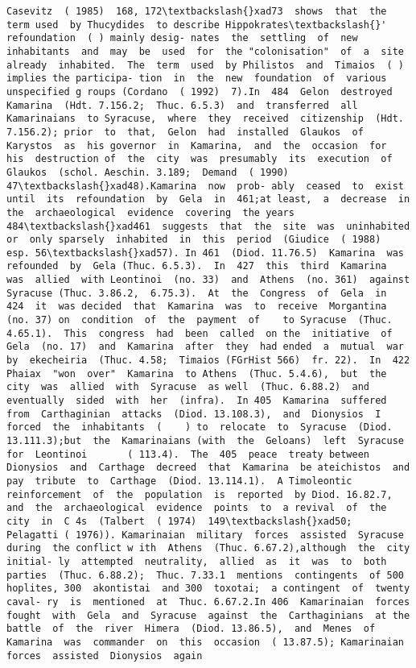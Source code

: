 \documentclass[11pt]{article}
\begin{document}
\begin{Verbatim}[commandchars=\\\{\}]
Casevitz  ( 1985)  168, 172\textbackslash{}xad73  shows  that  the  term used  by Thucydides  to describe Hippokrates\textbackslash{}'  refoundation  ( ) mainly desig- nates  the  settling  of  new  inhabitants  and  may  be  used  for  the "colonisation"  of  a  site  already  inhabited.  The  term  used  by Philistos  and  Timaios  ( ) implies the participa- tion  in  the  new  foundation  of  various  unspecified g roups (Cordano  ( 1992)  7).In  484  Gelon  destroyed  Kamarina  (Hdt. 7.156.2;  Thuc. 6.5.3)  and  transferred  all  Kamarinaians  to Syracuse,  where  they  received  citizenship  (Hdt. 7.156.2); prior  to  that,  Gelon  had  installed  Glaukos  of  Karystos  as  his governor  in  Kamarina,  and  the  occasion  for  his  destruction of  the  city  was  presumably  its  execution  of  Glaukos  (schol. Aeschin. 3.189;  Demand  ( 1990)  47\textbackslash{}xad48).Kamarina  now  prob- ably  ceased  to  exist  until  its  refoundation  by  Gela  in  461;at least,  a  decrease  in  the  archaeological  evidence  covering  the years 484\textbackslash{}xad461  suggests  that  the  site  was  uninhabited  or  only sparsely  inhabited  in  this  period  (Giudice  ( 1988)  esp. 56\textbackslash{}xad57). In 461  (Diod. 11.76.5)  Kamarina  was  refounded  by  Gela (Thuc. 6.5.3).  In  427  this  third  Kamarina  was  allied  with Leontinoi  (no. 33)  and  Athens  (no. 361)  against  Syracuse (Thuc. 3.86.2,  6.75.3).  At  the  Congress  of  Gela  in  424  it  was decided  that  Kamarina  was  to  receive  Morgantina  (no. 37) on  condition  of  the  payment  of    to Syracuse  (Thuc. 4.65.1).  This  congress  had  been  called  on the  initiative  of  Gela  (no. 17)  and  Kamarina  after  they  had ended  a  mutual  war  by  ekecheiria  (Thuc. 4.58;  Timaios (FGrHist 566)  fr. 22).  In  422  Phaiax  "won  over"  Kamarina  to Athens  (Thuc. 5.4.6),  but  the  city  was  allied  with  Syracuse  as well  (Thuc. 6.88.2)  and  eventually  sided  with  her  (infra).  In 405  Kamarina  suffered  from  Carthaginian  attacks  (Diod. 13.108.3),  and  Dionysios  I  forced  the  inhabitants  (    ) to  relocate  to  Syracuse  (Diod. 13.111.3);but  the  Kamarinaians (with  the  Geloans)  left  Syracuse  for  Leontinoi       ( 113.4).  The  405  peace  treaty between  Dionysios  and  Carthage  decreed  that  Kamarina  be ateichistos  and  pay  tribute  to  Carthage  (Diod. 13.114.1).  A Timoleontic  reinforcement  of  the  population  is  reported  by Diod. 16.82.7,  and  the  archaeological  evidence  points  to  a revival  of  the  city  in  C 4s  (Talbert  ( 1974)  149\textbackslash{}xad50;  Pelagatti ( 1976)). Kamarinaian  military  forces  assisted  Syracuse  during  the conflict w ith  Athens  (Thuc. 6.67.2),although  the  city  initial- ly  attempted  neutrality,  allied  as  it  was  to  both  parties  (Thuc. 6.88.2);  Thuc. 7.33.1  mentions  contingents  of 500  hoplites, 300  akontistai  and 300  toxotai;  a contingent  of  twenty  caval- ry  is  mentioned  at  Thuc. 6.67.2.In 406  Kamarinaian  forces fought  with  Gela  and  Syracuse  against  the  Carthaginians  at the  battle  of  the  river  Himera  (Diod. 13.86.5),  and  Menes  of Kamarina  was  commander  on  this  occasion  ( 13.87.5); Kamarinaian  forces  assisted  Dionysios  again  
\end{Verbatim}
\end{document}
